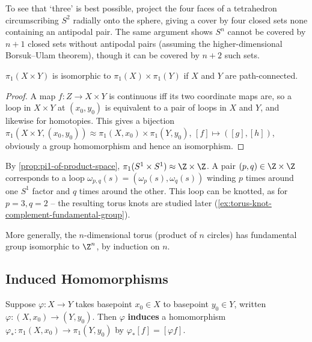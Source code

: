 To see that `three' is best possible, project the four faces of a tetrahedron
circumscribing $S^2$ radially onto the sphere, giving a cover by four closed sets none
containing an antipodal pair. The same argument shows $S^n$ cannot be covered by
$n+1$ closed sets without antipodal pairs (assuming the higher-dimensional
Borsuk--Ulam theorem), though it can be covered by $n+2$ such sets.

\begin{proposition}[$\pi_1$ of a product]
\label{prop:pi1-of-product-space}
$\pi_1(X\times Y)$ is isomorphic to $\pi_1(X)\times\pi_1(Y)$ if $X$ and $Y$ are
path-connected.
\end{proposition}

\begin{proof}
A map $f : Z \to X\times Y$ is continuous iff its two coordinate maps are, so a loop
in $X\times Y$ at $(x_0,y_0)$ is equivalent to a pair of loops in $X$ and $Y$, and likewise
for homotopies. This gives a bijection
$\pi_1(X\times Y,(x_0,y_0)) \approx \pi_1(X,x_0)\times\pi_1(Y,y_0)$, $[f]\mapsto([g],[h])$, obviously a
group homomorphism and hence an isomorphism.
\end{proof}

\begin{example}
\label{ex:torus-fundamental-group}
By \cref{prop:pi1-of-product-space}, $\pi_1(S^1\times S^1) \approx \Z\times\Z$. A pair
$(p,q) \in \Z\times\Z$ corresponds to a loop $\omega_{p,q}(s) = (\omega_p(s),\omega_q(s))$ winding $p$
times around one $S^1$ factor and $q$ times around the other. This loop can be
knotted, as for $p=3,q=2$ -- the resulting torus knots are studied later
(\cref{ex:torus-knot-complement-fundamental-group}).



More generally, the $n$-dimensional torus (product of $n$ circles) has fundamental
group isomorphic to $\Z^n$, by induction on $n$.
\end{example}

\subsection*{Induced Homomorphisms}

\begin{definition}
\label{def:induced-homomorphism}
Suppose $\varphi : X \to Y$ takes basepoint $x_0 \in X$ to basepoint $y_0 \in Y$, written
$\varphi : (X,x_0) \to (Y,y_0)$. Then $\varphi$ \textbf{induces} a homomorphism
$\varphi_* : \pi_1(X,x_0) \to \pi_1(Y,y_0)$ by $\varphi_*[f] = [\varphi f]$.
\end{definition}

